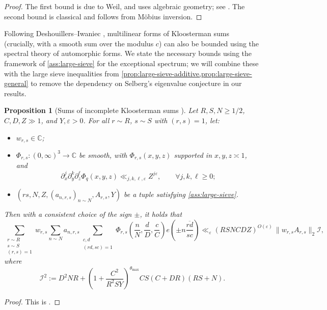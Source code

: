 \documentclass[reqno,11pt]{amsart}
\newtheorem{proposition}[theorem]{Proposition}
\theoremstyle{remark}
\numberwithin{equation}{section}
\newcommand{\C}{\mathbb{C}}
\newcommand{\msI}{\mathscr{I}}
\newcommand{\eps}{\varepsilon}
\renewcommand{\bar}{\overline}
\begin{document}
\begin{proof}
The first bound is due to Weil, and uses algebraic geometry; see \cite[Corollary 11.12]{iwaniec2021analytic}. The second bound is classical and follows from M\"obius inversion.
\end{proof}

Following Deshouillers--Iwaniec \cite{deshouillers1982kloosterman}, multilinear forms of Kloosterman sums (crucially, with a smooth sum over the modulus $c$) can also be bounded using the spectral theory of automorphic forms. We state the necessary bounds using the framework of \cref{ass:large-sieve} for the exceptional spectrum; we will combine these with the large sieve inequalities from \cref{prop:large-sieve-additive,prop:large-sieve-general} to remove the dependency on Selberg's eigenvalue conjecture in our results.

\begin{proposition}[Sums of incomplete Kloosterman sums \cite{pascadi2024large}] \label{prop:kloosterman-incomplete}
Let $R, S, N \ge 1/2$, $C, D, Z \gg 1$, and $Y, \eps > 0$. For all $r \sim R$, $s \sim S$ with $(r, s) = 1$, let:
\begin{itemize} 
    \item $w_{r,s} \in \C$; 
    \item $\Phi_{r,s} : (0, \infty)^3 \to \C$ be smooth, with $\Phi_{r,s}(x, y, z)$ supported in $x, y, z \asymp 1$, and
    \[ 
        \partial_x^j \partial_y^k \partial_z^\ell \Phi_q(x, y, z) \ll_{j,k,\ell,\eps} Z^{j\eps},
        \qquad 
        \forall j, k, \ell \ge 0;
    \]
    \item $(rs, N, Z, (a_{n,r,s})_{n \sim N}, A_{r,s}, Y)$ be a tuple satisfying \cref{ass:large-sieve}.
\end{itemize} 
Then with a consistent choice of the sign $\pm$, it holds that
\begin{equation} \label{eq:kloosterman-incomplete}
    \sum_{\substack{r \sim R \\ s \sim S \\ (r, s) = 1}} w_{r,s}
    \sum_{n \sim N} a_{n,r,s}
    \sum_{\substack{c, d \\ (rd, sc) = 1}} \Phi_{r,s}\left(\frac{n}{N}, \frac{d}{D}, \frac{c}{C}\right) e\left(\pm n \frac{\bar{rd}}{sc}\right)
    \ll_\eps 
    (RSNCDZ)^{O(\eps)}\, \|w_{r,s} A_{r,s}\|_2 \msI,
\end{equation}
where
\[
    \msI^2 := D^2 NR
    +
    \left(1 + \frac{C^2}{R^2 S Y}\right)^{\theta_{\max}} 
    CS(C + DR)(RS + N).
\]
\end{proposition}
\begin{proof}
This is \cite[Corollary 18]{pascadi2024large}.
\end{proof}
\end{document}

